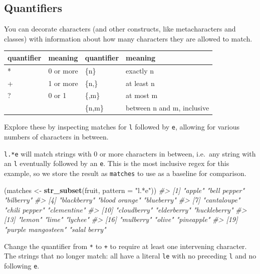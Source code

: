 \documentclass[
]{book}
\newenvironment{Shaded}{\begin{snugshade}}{\end{snugshade}}
\newcommand{\CommentTok}[1]{\textcolor[rgb]{0.56,0.35,0.01}{\textit{#1}}}
\newcommand{\DataTypeTok}[1]{\textcolor[rgb]{0.13,0.29,0.53}{#1}}
\newcommand{\KeywordTok}[1]{\textcolor[rgb]{0.13,0.29,0.53}{\textbf{#1}}}
\newcommand{\NormalTok}[1]{#1}
\newcommand{\StringTok}[1]{\textcolor[rgb]{0.31,0.60,0.02}{#1}}
\begin{document}
\hypertarget{quantifiers}{%
\subsection{Quantifiers}\label{quantifiers}}

You can decorate characters (and other constructs, like metacharacters and classes) with information about how many characters they are allowed to match.

\begin{longtable}[]{@{}llll@{}}
\toprule
quantifier & meaning & quantifier & meaning\tabularnewline
\midrule
\endhead
* & 0 or more & \{n\} & exactly n\tabularnewline
+ & 1 or more & \{n,\} & at least n\tabularnewline
? & 0 or 1 & \{,m\} & at most m\tabularnewline
& & \{n,m\} & between n and m, inclusive\tabularnewline
\bottomrule
\end{longtable}

Explore these by inspecting matches for \texttt{l} followed by \texttt{e}, allowing for various numbers of characters in between.

\texttt{l.*e} will match strings with 0 or more characters in between, i.e.~any string with an \texttt{l} eventually followed by an \texttt{e}. This is the most inclusive regex for this example, so we store the result as \texttt{matches} to use as a baseline for comparison.

\begin{Shaded}
\begin{Highlighting}[]
\NormalTok{(matches <-}\StringTok{ }\KeywordTok{str_subset}\NormalTok{(fruit, }\DataTypeTok{pattern =} \StringTok{"l.*e"}\NormalTok{))}
\CommentTok{#>  [1] "apple"             "bell pepper"       "bilberry"         }
\CommentTok{#>  [4] "blackberry"        "blood orange"      "blueberry"        }
\CommentTok{#>  [7] "cantaloupe"        "chili pepper"      "clementine"       }
\CommentTok{#> [10] "cloudberry"        "elderberry"        "huckleberry"      }
\CommentTok{#> [13] "lemon"             "lime"              "lychee"           }
\CommentTok{#> [16] "mulberry"          "olive"             "pineapple"        }
\CommentTok{#> [19] "purple mangosteen" "salal berry"}
\end{Highlighting}
\end{Shaded}

Change the quantifier from \texttt{*} to \texttt{+} to require at least one intervening character. The strings that no longer match: all have a literal \texttt{le} with no preceding \texttt{l} and no following \texttt{e}.
\end{document}

